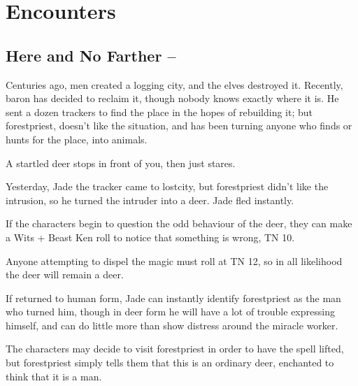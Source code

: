 \section{Encounters}

\begin{multicols}{2}

\subsection[Here and No Farther]{Here and No Farther -- \encnum}\label{herenofarther}

Centuries ago, men created a logging city, and the elves destroyed it.  Recently, \gls{baron} has decided to reclaim it, though nobody knows exactly where it is.  He sent a dozen trackers to find the place in the hopes of rebuilding it; but \gls{forestpriest}, doesn't like the situation, and has been turning anyone who finds or hunts for the place, into animals.


\begin{boxtext}

	A startled deer stops in front of you, then just stares.

\end{boxtext}

Yesterday, Jade the tracker came to \gls{lostcity}, but \gls{forestpriest} didn't like the intrusion, so he turned the intruder into a deer.  Jade fled instantly.

If the characters begin to question the odd behaviour of the deer, they can make a Wits + Beast Ken roll to notice that something is wrong, TN 10.

Anyone attempting to dispel the magic must roll at TN 12, so in all likelihood the deer will remain a deer.


If returned to human form, Jade can instantly identify \gls{forestpriest} as the man who turned him, though in deer form he will have a lot of trouble expressing himself, and can do little more than show distress around the miracle worker.

The characters may decide to visit \gls{forestpriest} in order to have the spell lifted, but \gls{forestpriest} simply tells them that this is an ordinary deer, enchanted to think that it is a man.


\end{multicols}
